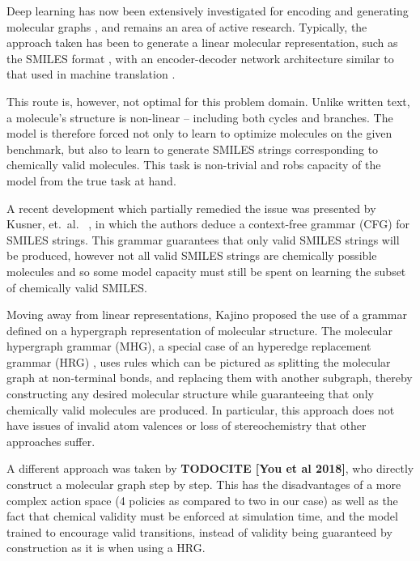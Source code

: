 \documentclass{article}
\newcommand{\CITE}[1]{{\bf TODOCITE [#1]}}
\begin{document}
Deep learning has now been extensively investigated for encoding and generating molecular graphs \cite{duvenaud2015, kearnes2016, gilmer2017, dai2018, jin2018, simonovsky2018, kusner2017, gomezbombarelli2016, guimaraes2017}, and remains an area of active research. Typically, the approach taken has been to generate a linear molecular representation, such as the SMILES format \cite{weininger1988}, with an encoder-decoder network architecture similar to that used in machine translation \cite{gomezbombarelli2016}.

This route is, however, not optimal for this problem domain. Unlike written text, a molecule's structure is non-linear -- including both cycles and branches. The model is therefore forced not only to learn to optimize molecules on the given benchmark, but also to learn to generate SMILES strings corresponding to chemically valid molecules. This task is non-trivial and robs capacity of the model from the true task at hand.

A recent development which partially remedied the issue was presented by Kusner, et.~al.~ \cite{kusner2017}, in which the authors deduce a context-free grammar (CFG) for SMILES strings. This grammar guarantees that only valid SMILES strings will be produced, however not all valid SMILES strings are chemically possible molecules and so some model capacity must still be spent on learning the subset of chemically valid SMILES.

Moving away from linear representations, Kajino \cite{kajino2018} proposed the use of a grammar defined on a hypergraph representation of molecular structure. The molecular hypergraph grammar (MHG), a special case of an hyperedge replacement grammar (HRG) \cite{drewes1997}, uses rules which can be pictured as splitting the molecular graph at non-terminal bonds, and replacing them with another subgraph, thereby constructing any desired molecular structure while guaranteeing that only chemically valid molecules are produced. In particular, this approach does not have issues of invalid atom valences or loss of stereochemistry that other approaches suffer.

A different approach was taken by \CITE{You et al 2018}, who directly construct a molecular graph step by step. This has the disadvantages of a more complex action space (4 policies as compared to two in our case) as well as the fact that chemical validity must be enforced at simulation time, and the model trained to encourage valid transitions, instead of validity being guaranteed by construction as it is when using a HRG.
\end{document}

